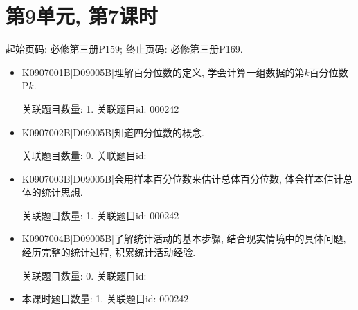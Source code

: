 \section*{第9单元, 第7课时}
起始页码: 必修第三册P159; 终止页码: 必修第三册P169.
\begin{itemize}
\item K0907001B|D09005B|理解百分位数的定义, 学会计算一组数据的第$k$百分位数P$k$.

关联题目数量: 1. 关联题目id: 000242

\item K0907002B|D09005B|知道四分位数的概念.

关联题目数量: 0. 关联题目id: 

\item K0907003B|D09005B|会用样本百分位数来估计总体百分位数, 体会样本估计总体的统计思想.

关联题目数量: 1. 关联题目id: 000242

\item K0907004B|D09005B|了解统计活动的基本步骤, 结合现实情境中的具体问题, 经历完整的统计过程, 积累统计活动经验.

关联题目数量: 0. 关联题目id: 

\item 本课时题目数量: 1. 关联题目id: 000242

\end{itemize}

